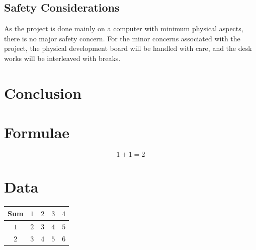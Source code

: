 \documentclass[journal]{IEEEtran}
\begin{document}
\subsection{Safety Considerations}
As the project is done mainly on a computer with minimum physical aspects,
there is no major safety concern.
For the minor concerns associated with the project, 
the physical development board will be handled with care, and the desk works
will be interleaved with breaks.

\section{Conclusion}


\newpage
\appendices

\section{Formulae}
$$1 + 1 = 2$$

\section{Data}

\begin{table}[H]
  \centering
  \begin{tabular}{c|cccc}
    Sum             & $1$ & $2$ & $3$ & $4$ \\
    \hline
    $1$             & $2$ & $3$ & $4$ & $5$ \\
    $2$             & $3$ & $4$ & $5$ & $6$ \\
  \end{tabular}
\end{table}
\end{document}
